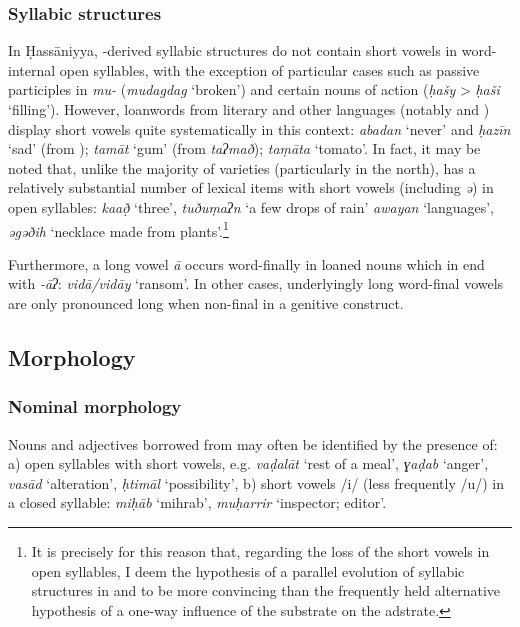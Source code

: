 \documentclass[output=paper]{langsci/langscibook}
\begin{document}
\subsubsection{Syllabic structures} %

In Ḥassāniyya, -derived syllabic structures do not contain short vowels in word-internal open syllables, with the exception of particular cases such as {passive} participles in \textit{mu-} (\textit{mudagdag} ‘broken’) and certain nouns of action (\textit{ḥašy} > \textit{ḥaši} ‘filling’). However, {loanwords} from literary  and other languages (notably  and ) display short vowels quite systematically in this context: \textit{abadan} ‘never’ and \textit{ḥazīn} ‘sad’ (from  ); \textit{tamāt} ‘gum’ (from  \textit{taʔmað}); \textit{taṃāta} ‘tomato’. In fact, it may be noted that, unlike the majority of  varieties (particularly in the north),  has a relatively substantial number of lexical items with short vowels (including \textit{ə}) in open syllables: \textit{ka{\R}að̣} ‘three’, \textit{tuðu}\textit{ṃaʔn} ‘a few drops of rain’ \textit{awayan} ‘languages’, \textit{əgəðih} ‘necklace made from plants'.\footnote{It is precisely for this reason that, regarding the loss of the short vowels in open syllables, I deem the hypothesis of a parallel evolution of syllabic structures in   and  to be more convincing than the frequently held alternative hypothesis of a one-way influence of the  {substrate} on the  {adstrate}.} 

Furthermore, a {long vowel} \textit{ā} occurs word-finally in loaned nouns which in   end with \textit{{}-āʔ}: \textit{vidā/vidāy} ‘ransom’. In other cases, underlyingly long word-final vowels are only pronounced long when non-final in a genitive construct.

\subsection{Morphology} %

\subsubsection{Nominal morphology} %


Nouns and adjectives borrowed from   may often be identified by the presence of: a) open syllables with short vowels, e.g. \textit{vaḍa}\textit{lāt} ‘rest of a meal’, \textit{ɣaḍab} ‘anger’, \textit{vasād} ‘alteration’, \textit{ḥtimāl} ‘possibility’, b) short vowels /i/ (less frequently /u/) in a closed syllable: \textit{miḥ{\R}āb} ‘mihrab’, \textit{muḥarrir} ‘inspector; editor’.
\end{document}

